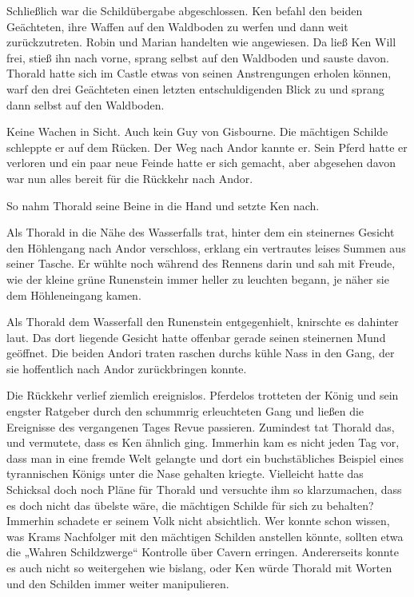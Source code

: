 Schließlich war die Schildübergabe abgeschlossen. Ken befahl den beiden Geächteten, ihre Waffen auf den Waldboden zu werfen und dann weit zurückzutreten. Robin und Marian handelten wie angewiesen. Da ließ Ken Will frei, stieß ihn nach vorne, sprang selbst auf den Waldboden und sauste davon. Thorald hatte sich im Castle etwas von seinen Anstrengungen erholen können, warf den drei Geächteten einen letzten entschuldigenden Blick zu und sprang dann selbst auf den Waldboden.

Keine Wachen in Sicht. Auch kein Guy von Gisbourne. Die mächtigen Schilde schleppte er auf dem Rücken. Der Weg nach Andor kannte er. Sein Pferd hatte er verloren und ein paar neue Feinde hatte er sich gemacht, aber abgesehen davon war nun alles bereit für die Rückkehr nach Andor.

So nahm Thorald seine Beine in die Hand und setzte Ken nach.



\trennzeichen



Als Thorald in die Nähe des Wasserfalls trat, hinter dem ein steinernes Gesicht den Höhlengang nach Andor verschloss, erklang ein vertrautes leises Summen aus seiner Tasche. Er wühlte noch während des Rennens darin und sah mit Freude, wie der kleine grüne Runenstein immer heller zu leuchten begann, je näher sie dem Höhleneingang kamen.

Als Thorald dem Wasserfall den Runenstein entgegenhielt, knirschte es dahinter laut. Das dort liegende Gesicht hatte offenbar gerade seinen steinernen Mund geöffnet. Die beiden Andori traten raschen durchs kühle Nass in den Gang, der sie hoffentlich nach Andor zurückbringen konnte.

\nurvollversion{\newpage}

Die Rückkehr verlief ziemlich ereignislos. Pferdelos trotteten der König und sein engster Ratgeber durch den schummrig erleuchteten Gang und ließen die Ereignisse des vergangenen Tages Revue passieren. Zumindest tat Thorald das, und vermutete, dass es Ken ähnlich ging. Immerhin kam es nicht jeden Tag vor, dass man in eine fremde Welt gelangte und dort ein buchstäbliches Beispiel eines tyrannischen Königs unter die Nase gehalten kriegte. Vielleicht hatte das Schicksal doch noch Pläne für Thorald und versuchte ihm so klarzumachen, dass es doch nicht das übelste wäre, die mächtigen Schilde für sich zu behalten? Immerhin schadete er seinem Volk nicht absichtlich. Wer konnte schon wissen, was Krams Nachfolger mit den mächtigen Schilden anstellen könnte, sollten etwa die „Wahren Schildzwerge“ Kontrolle über Cavern erringen. Andererseits konnte es auch nicht so weitergehen wie bislang, oder Ken würde Thorald mit Worten und den Schilden immer weiter manipulieren.

